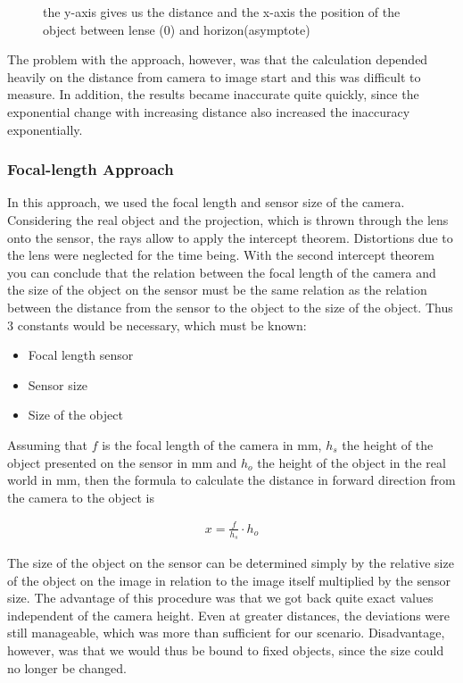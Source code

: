 \begin{figure}[htbp]
\centering

\caption{the y-axis gives us the distance and the
x-axis the position of the object between lense (0) and horizon(asymptote)}
\label{fig:exponentialAsymptoteGraph}
\end{figure}

The problem with the approach, however, was that the calculation depended heavily
on the distance from camera to image start and this was difficult to measure. In
addition, the results became inaccurate quite quickly, since the exponential change
with increasing distance also increased the inaccuracy exponentially.

\subsubsection{Focal-length Approach}
In this approach, we used the focal length and sensor size of the camera. Considering the real object and the projection, which is thrown through the lens onto the sensor, the rays allow to apply the intercept theorem. Distortions due to the lens were neglected for the time being. With the second intercept theorem you can conclude that the relation between the focal length of the camera and the size of the object on the sensor must be the same relation as the relation between the distance from the sensor to the object to the size of the object. Thus 3 constants
would be necessary, which must be known:
\begin{itemize}
\item Focal length sensor
\item Sensor size
\item Size of the object
\end{itemize}

Assuming that $f$ is the focal length of the camera in mm, $h_s$ the height of the object presented on the sensor in mm and $h_o$ the height of the object in the real world in mm, then the formula to calculate the distance in forward direction from the camera to the object is

\begin{align}
    x = \frac{f}{h_s} \cdot h_o
\end{align}

The size of the object on the sensor can be determined simply by the relative size of the object on the image in relation to the image itself multiplied by the sensor size.
The advantage of this procedure was that we got back quite exact values
independent of the camera height. Even at greater distances, the deviations were still manageable, which was more than sufficient for our scenario.
Disadvantage, however, was that we would thus be bound to fixed objects, since the size could no longer be changed.

